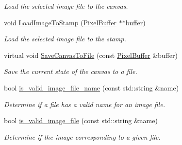 \begin{DoxyCompactItemize}
\begin{DoxyCompactList}\small\item\em Load the selected image file to the canvas. \end{DoxyCompactList}\item 
void \hyperlink{classimage__tools_1_1IOManager_a9631b9d5b56b1f9ecfb0f6cf900a5640}{Load\+Image\+To\+Stamp} (\hyperlink{classimage__tools_1_1PixelBuffer}{Pixel\+Buffer} $\ast$$\ast$buffer)\hypertarget{classimage__tools_1_1IOManager_a9631b9d5b56b1f9ecfb0f6cf900a5640}{}\label{classimage__tools_1_1IOManager_a9631b9d5b56b1f9ecfb0f6cf900a5640}

\begin{DoxyCompactList}\small\item\em Load the selected image file to the stamp. \end{DoxyCompactList}\item 
virtual void \hyperlink{classimage__tools_1_1IOManager_acf47f54c83d9df771342b2fb6891dad2}{Save\+Canvas\+To\+File} (const \hyperlink{classimage__tools_1_1PixelBuffer}{Pixel\+Buffer} \&buffer)\hypertarget{classimage__tools_1_1IOManager_acf47f54c83d9df771342b2fb6891dad2}{}\label{classimage__tools_1_1IOManager_acf47f54c83d9df771342b2fb6891dad2}

\begin{DoxyCompactList}\small\item\em Save the current state of the canvas to a file. \end{DoxyCompactList}\item 
bool \hyperlink{classimage__tools_1_1IOManager_ac65d32aa03ea74c4c81d135a4e56f6fd}{is\+\_\+valid\+\_\+image\+\_\+file\+\_\+name} (const std\+::string \&name)
\begin{DoxyCompactList}\small\item\em Determine if a file has a valid name for an image file. \end{DoxyCompactList}\item 
bool \hyperlink{classimage__tools_1_1IOManager_af5559c30af4a3b2d1a86c6081d840170}{is\+\_\+valid\+\_\+image\+\_\+file} (const std\+::string \&name)
\begin{DoxyCompactList}\small\item\em Determine if the image corresponding to a given file. \end{DoxyCompactList}\end{DoxyCompactItemize}
